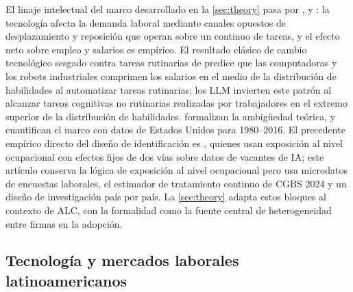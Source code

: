 El linaje intelectual del marco desarrollado en la \cref{sec:theory} pasa por \citet{AutorLM2003_skill_content}, \citet{AcemogluAutor2011_tasks} y \citet{AcemogluRestrepo2018_race, AcemogluRestrepo2022_tasks_inequality}: la tecnolog\'{i}a afecta la demanda laboral mediante canales opuestos de desplazamiento y reposici\'{o}n que operan sobre un continuo de tareas, y el efecto neto sobre empleo y salarios es emp\'{i}rico. El resultado cl\'{a}sico de cambio tecnol\'{o}gico sesgado contra tareas rutinarias de \citet{AutorLM2003_skill_content} predice que las computadoras y los robots industriales comprimen los salarios en el medio de la distribuci\'{o}n de habilidades al automatizar tareas rutinarias; los LLM invierten este patr\'{o}n al alcanzar tareas cognitivas no rutinarias realizadas por trabajadores en el extremo superior de la distribuci\'{o}n de habilidades. \citet{Agrawal2019_prediction} formalizan la ambig\"{u}edad te\'{o}rica, y \citet{AcemogluRestrepo2022_tasks_inequality} cuantifican el marco con datos de Estados Unidos para 1980--2016. El precedente emp\'{i}rico directo del dise\~{n}o de identificaci\'{o}n es \citet{AcemogluAHR2022_ai_jobs}, quienes usan exposici\'{o}n al nivel ocupacional con efectos fijos de dos v\'{i}as sobre datos de vacantes de IA; este art\'{i}culo conserva la l\'{o}gica de exposici\'{o}n al nivel ocupacional pero usa microdatos de encuestas laborales, el estimador de tratamiento continuo de CGBS 2024 y un dise\~{n}o de investigaci\'{o}n pa\'{i}s por pa\'{i}s. La \cref{sec:theory} adapta estos bloques al contexto de ALC, con la formalidad como la fuente central de heterogeneidad entre firmas en la adopci\'{o}n.

\subsection{Tecnolog\'{i}a y mercados laborales latinoamericanos}
\label{subsec:lit_lac}

